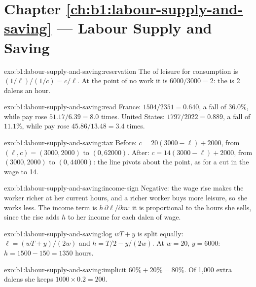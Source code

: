 \section*{Chapter \ref{ch:b1:labour-supply-and-saving} --- Labour Supply and Saving}

\begin{solution}{exo:b1:labour-supply-and-saving:reservation}
The  of leisure for consumption is $(1/\ell)/(1/c) = c/\ell$. At the point of
no work it is $6000/3000 = 2$: the  is 2 dalens an hour.
\end{solution}

\begin{solution}{exo:b1:labour-supply-and-saving:read}
France: $1504/2351 = 0.640$, a fall of $36.0\%$, while pay rose
$51.17/6.39 = 8.0$ times. United States: $1797/2022 = 0.889$, a fall of $11.1\%$,
while pay rose $45.86/13.48 = 3.4$ times.
\end{solution}

\begin{solution}{exo:b1:labour-supply-and-saving:tax}
Before: $c = 20(3000 - \ell) + 2000$, from $(\ell, c) = (3000, 2000)$ to $(0, 62000)$.
After: $c = 14(3000 - \ell) + 2000$, from $(3000, 2000)$ to $(0, 44000)$: the line
pivots about the  point, as for a cut in the wage to 14.
\end{solution}

\begin{solution}{exo:b1:labour-supply-and-saving:income-sign}
Negative: the wage rise makes the worker richer at her current hours, and a
richer worker buys more leisure, so she works less. The income term is
$h\,\partial\ell/\partial m$: it is proportional to the hours she sells, since
the rise adds $h$ to her income for each dalen of wage.
\end{solution}

\begin{solution}{exo:b1:labour-supply-and-saving:log}
 $wT + y$ is split equally: $\ell = (wT + y)/(2w)$ and
$h = T/2 - y/(2w)$. At $w = 20$, $y = 6000$: $h = 1500 - 150 = 1350$ hours.
\end{solution}

\begin{solution}{exo:b1:labour-supply-and-saving:implicit}
$60\% + 20\% = 80\%$. Of 1,000 extra dalens she keeps $1000 \times 0.2 = 200$.
\end{solution}

